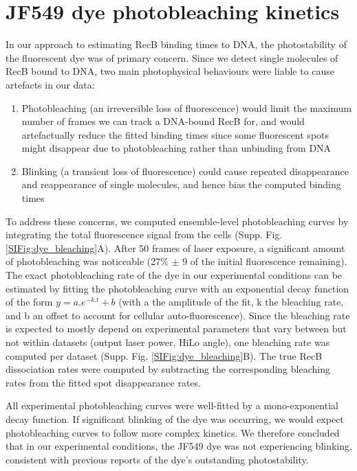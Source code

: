 \captionsetup*{format=largeformat}
\section{JF549 dye photobleaching kinetics}
\label{note:dye_bleaching} 

In our approach to estimating RecB binding times to DNA, the photostability of the fluorescent dye was of primary concern. Since we detect single molecules of RecB bound to DNA, two main photophysical behaviours were liable to cause artefacts in our data:
\begin{enumerate}
    \item Photobleaching (an irreversible loss of fluorescence) would limit the maximum number of frames we can track a DNA-bound RecB for, and would artefactually reduce the fitted binding times since some fluorescent spots might disappear due to photobleaching rather than unbinding from DNA
    \item Blinking (a transient loss of fluorescence) could cause repeated disappearance and reappearance of single molecules, and hence bias the computed binding times
\end{enumerate}

To address these concerns, we computed ensemble-level photobleaching curves by integrating the total fluorescence signal from the cells (Supp. Fig. \ref{SIFig:dye_bleaching}A). After 50 frames of laser exposure, a significant amount of photobleaching was noticeable (27\% $\pm$ 9 of the initial fluorescence remaining). The exact photobleaching rate of the dye in our experimental conditions can be estimated by fitting the photobleaching curve with an exponential decay function of the form $y=a.e^{-k.t}+b$ (with a the amplitude of the fit, k the bleaching rate, and b an offset to account for cellular auto-fluorescence). Since the bleaching rate is expected to mostly depend on experimental parameters that vary between but not within datasets (output laser power, HiLo angle), one bleaching rate was computed per dataset (Supp. Fig. \ref{SIFig:dye_bleaching}B). The true RecB dissociation rates were computed by subtracting the corresponding bleaching rates from the fitted spot disappearance rates.

All experimental photobleaching curves were well-fitted by a mono-exponential decay function. If significant blinking of the dye was occurring, we would expect photobleaching curves to follow more complex kinetics.\cite{} We therefore concluded that in our experimental conditions, the JF549 dye was not experiencing blinking, consistent with previous reports of the dye's outstanding photostability.\cite{}

